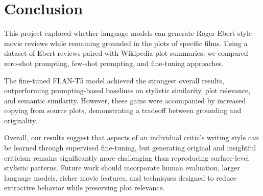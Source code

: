 \section{Conclusion}

This project explored whether language models can generate Roger Ebert-style movie reviews while remaining grounded in the plots of specific films. Using a dataset of Ebert reviews paired with Wikipedia plot summaries, we compared zero-shot prompting, few-shot prompting, and fine-tuning approaches.

The fine-tuned FLAN-T5 model achieved the strongest overall results, outperforming prompting-based baselines on stylistic similarity, plot relevance, and semantic similarity. However, these gains were accompanied by increased copying from source plots, demonstrating a tradeoff between grounding and originality.

Overall, our results suggest that aspects of an individual critic's writing style can be learned through supervised fine-tuning, but generating original and insightful criticism remains significantly more challenging than reproducing surface-level stylistic patterns. Future work should incorporate human evaluation, larger language models, richer movie features, and techniques designed to reduce extractive behavior while preserving plot relevance.
